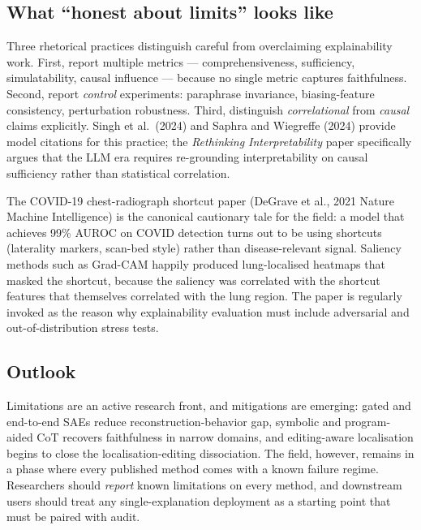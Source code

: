 \subsection{What ``honest about limits'' looks like}\label{what-honest-about-limits-looks-like}

Three rhetorical practices distinguish careful from overclaiming explainability work. First, report multiple metrics --- comprehensiveness, sufficiency, simulatability, causal influence --- because no single metric captures faithfulness. Second, report \emph{control} experiments: paraphrase invariance, biasing-feature consistency, perturbation robustness. Third, distinguish \emph{correlational} from \emph{causal} claims explicitly. Singh et al.~(2024) and Saphra and Wiegreffe (2024) provide model citations for this practice; the \emph{Rethinking Interpretability} paper specifically argues that the LLM era requires re-grounding interpretability on causal sufficiency rather than statistical correlation.

The COVID-19 chest-radiograph shortcut paper (DeGrave et al., 2021 Nature Machine Intelligence) is the canonical cautionary tale for the field: a model that achieves 99\% AUROC on COVID detection turns out to be using shortcuts (laterality markers, scan-bed style) rather than disease-relevant signal. Saliency methods such as Grad-CAM happily produced lung-localised heatmaps that masked the shortcut, because the saliency was correlated with the shortcut features that themselves correlated with the lung region. The paper is regularly invoked as the reason why explainability evaluation must include adversarial and out-of-distribution stress tests.

\subsection{Outlook}\label{outlook-2}

Limitations are an active research front, and mitigations are emerging: gated and end-to-end SAEs reduce reconstruction-behavior gap, symbolic and program-aided CoT recovers faithfulness in narrow domains, and editing-aware localisation begins to close the localisation-editing dissociation. The field, however, remains in a phase where every published method comes with a known failure regime. Researchers should \emph{report} known limitations on every method, and downstream users should treat any single-explanation deployment as a starting point that must be paired with audit.

